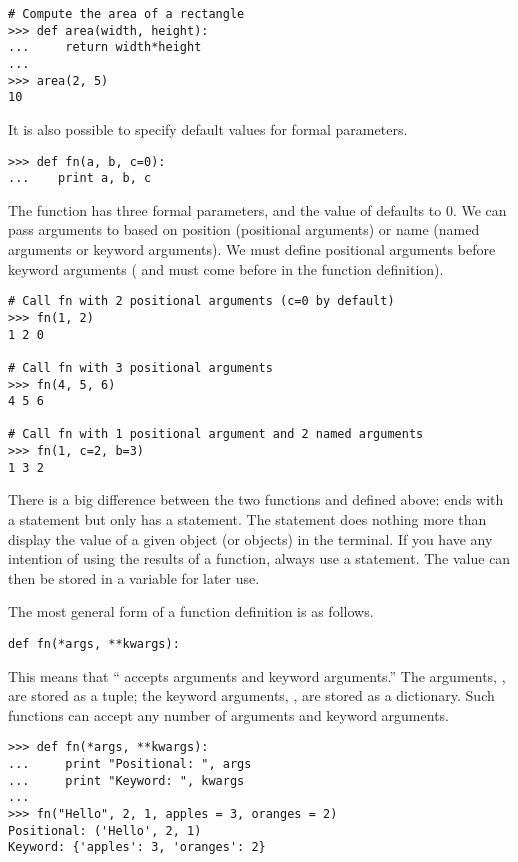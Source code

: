 \begin{lstlisting}
# Compute the area of a rectangle
>>> def area(width, height):
...     return width*height
...         
>>> area(2, 5)
10
\end{lstlisting}

It is also possible to specify default values for formal parameters.
\begin{lstlisting}
>>> def fn(a, b, c=0):
...    print a, b, c
\end{lstlisting} %
The function  has three formal parameters, and the value of  defaults to 0.
We can pass arguments to  based on position (positional arguments) or name (named arguments or keyword arguments). We must define positional arguments before keyword arguments ( and  must come before  in the function definition).
\begin{lstlisting}
# Call fn with 2 positional arguments (c=0 by default)
>>> fn(1, 2)
1 2 0

# Call fn with 3 positional arguments
>>> fn(4, 5, 6)
4 5 6

# Call fn with 1 positional argument and 2 named arguments
>>> fn(1, c=2, b=3)
1 3 2
\end{lstlisting}


There is a big difference between the two functions  and  defined above:  ends with a  statement but  only has a  statement.
The  statement does nothing more than display the value of a given object (or objects) in the terminal.
If you have any intention of using the results of a function, always use a  statement.
The value can then be stored in a variable for later use.

The most general form of a function definition is as follows.
\begin{lstlisting}
def fn(*args, **kwargs):
\end{lstlisting}
This means that `` accepts arguments and keyword arguments.''
The arguments, , are stored as a tuple; the keyword arguments, , are stored as a dictionary.
Such functions can accept any number of arguments and keyword arguments.
\begin{lstlisting}
>>> def fn(*args, **kwargs):
...     print "Positional: ", args
...     print "Keyword: ", kwargs
...     
>>> fn("Hello", 2, 1, apples = 3, oranges = 2)
Positional: ('Hello', 2, 1)
Keyword: {'apples': 3, 'oranges': 2}
\end{lstlisting}

